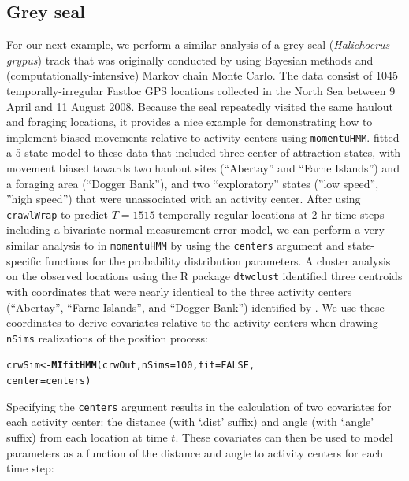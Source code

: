 \documentclass[12pt]{article}\usepackage[]{graphicx}\usepackage[]{color}
\makeatletter
\newcommand{\hlnum}[1]{\textcolor[rgb]{0.686,0.059,0.569}{#1}}%
\newcommand{\hlstd}[1]{\textcolor[rgb]{0.345,0.345,0.345}{#1}}%
\newcommand{\hlkwb}[1]{\textcolor[rgb]{0.69,0.353,0.396}{#1}}%
\newcommand{\hlkwc}[1]{\textcolor[rgb]{0.333,0.667,0.333}{#1}}%
\newcommand{\hlkwd}[1]{\textcolor[rgb]{0.737,0.353,0.396}{\textbf{#1}}}%
\newenvironment{kframe}{%
 \def\at@end@of@kframe{}%
 \ifinner\ifhmode%
  \def\at@end@of@kframe{\end{minipage}}%
  \begin{minipage}{\columnwidth}%
 \fi\fi%
 \def\FrameCommand##1{\hskip\@totalleftmargin \hskip-\fboxsep
 \colorbox{shadecolor}{##1}\hskip-\fboxsep
     \hskip-\linewidth \hskip-\@totalleftmargin \hskip\columnwidth}%
 \MakeFramed {\advance\hsize-\width
   \@totalleftmargin\z@ \linewidth\hsize
   \@setminipage}}%
 {\par\unskip\endMakeFramed%
 \at@end@of@kframe}
\newenvironment{knitrout}{}{} %
\makeatother
\begin{document}
\subsection{Grey seal}
\label{sec:greySeal}
For our next example, we perform a similar analysis of a grey seal ({\it Halichoerus grypus}) track that was originally conducted by \cite{McClintockEtAl2012} using Bayesian methods and (computationally-intensive) Markov chain Monte Carlo. The data consist of 1045 temporally-irregular Fastloc GPS locations collected in the North Sea between 9 April and 11 August 2008. Because the seal repeatedly visited the same haulout and foraging locations, it provides a nice example for demonstrating how to implement biased movements relative to activity centers using \verb|momentuHMM|. \cite{McClintockEtAl2012} fitted a 5-state model to these data that included three center of attraction states, with movement biased towards two haulout sites (``Abertay'' and ``Farne Islands'') and a foraging area (``Dogger Bank''), and two ``exploratory'' states (''low speed'', ''high speed'') that were unassociated with an activity center. After using \verb|crawlWrap| to predict $T=1515$ temporally-regular locations at 2 hr time steps including a bivariate normal measurement error model, we can perform a very similar analysis to \cite{McClintockEtAl2012} in \verb|momentuHMM| by using the \verb|centers| argument and state-specific functions for the probability distribution parameters. A cluster analysis on the observed locations using the R package \verb|dtwclust| \citep{SardaEspinosa2017} identified three centroids with coordinates that were nearly identical to the three activity centers (``Abertay'', ``Farne Islands'', and ``Dogger Bank'') identified by \cite{McClintockEtAl2012}. We use these coordinates to derive covariates relative to the activity centers when drawing \verb|nSims| realizations of the position process:
\begin{knitrout}
\color{fgcolor}\begin{kframe}
\begin{alltt}
\hlstd{crwSim} \hlkwb{<-} \hlkwd{MIfitHMM}\hlstd{(crwOut,} \hlkwc{nSims} \hlstd{=} \hlnum{100}\hlstd{,} \hlkwc{fit}\hlstd{=}\hlnum{FALSE}\hlstd{,}
                  \hlkwc{center} \hlstd{= centers)}
\end{alltt}
\end{kframe}
\end{knitrout}
Specifying the \verb|centers| argument results in the calculation of two covariates for each activity center: the distance (with `.dist' suffix) and angle (with `.angle' suffix) from each location at time $t$. These covariates can then be used to model parameters as a function of the distance and angle to activity centers for each time step:
\end{document}

